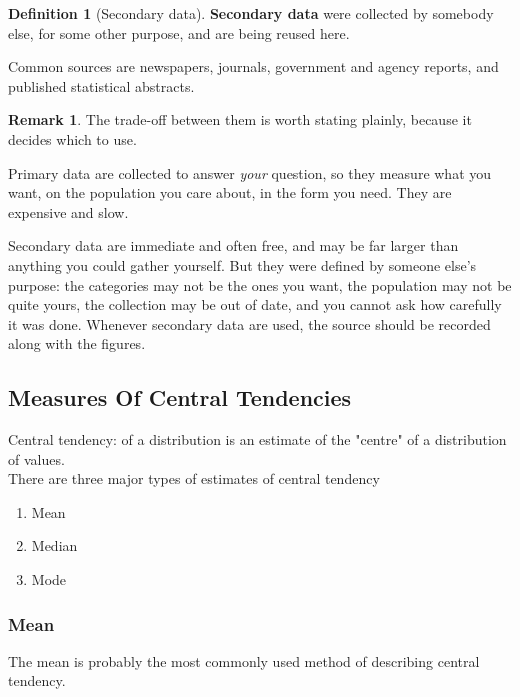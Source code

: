 \documentclass[11pt,a4paper]{article}
\theoremstyle{definition}
\newtheorem{definition}[thm]{Definition}
\newtheorem{remark}[thm]{Remark}
\begin{document}
\begin{definition}[Secondary data]
\textbf{Secondary data} were collected by somebody else, for some other purpose, and are
being reused here.
\end{definition}

Common sources are newspapers, journals, government and agency reports, and published
statistical abstracts.

\begin{remark}
The trade-off between them is worth stating plainly, because it decides which to use.

Primary data are collected to answer \emph{your} question, so they measure what you want,
on the population you care about, in the form you need. They are expensive and slow.

Secondary data are immediate and often free, and may be far larger than anything you could
gather yourself. But they were defined by someone else's purpose: the categories may not be
the ones you want, the population may not be quite yours, the collection may be out of date,
and you cannot ask how carefully it was done. Whenever secondary data are used, the source
should be recorded along with the figures.
\end{remark}





\pagebreak

\subsection{Measures Of Central Tendencies}
Central tendency: of a distribution is an estimate of the "centre" of a distribution of values.\\ There are three major types of estimates of central tendency
\begin{enumerate}
\item Mean
\item Median
\item Mode\\[1ex]
\end{enumerate}






\subsubsection{Mean}
The mean is probably the most commonly used method of describing central tendency.
\end{document}
